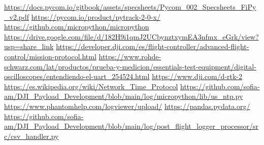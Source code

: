\documentclass[12pt]{article}
\begin{document}
\clearpage
{}
\begin{thebibliography}{9}
   \url{https://docs.pycom.io/gitbook/assets/specsheets/Pycom_002_Specsheets_FiPy_v2.pdf}
   \url{https://pycom.io/product/pytrack-2-0-x/}
   \url{https://github.com/micropython/micropython}
   \url{https://drive.google.com/file/d/182H9i1qmJ2UCbynztxymEA3nfmx_eGrk/view?usp=share_link}
   \url{https://developer.dji.com/es/flight-controller/advanced-flight-control/mission-protocol.html}
   \url{https://www.rohde-schwarz.com/lat/productos/prueba-y-medicion/essentials-test-equipment/digital-oscilloscopes/entendiendo-el-uart_254524.html}
   \url{https://www.dji.com/d-rtk-2}
   \url{https://es.wikipedia.org/wiki/Network_Time_Protocol}
   \url{https://github.com/sofia-am/DJI_Payload_Development/blob/main/log/micropython/lib/us_ntp.py}
   \url{https://www.phantomhelp.com/logviewer/upload/}
   \url{https://pandas.pydata.org/}
   \url{https://github.com/sofia-am/DJI\_Payload\_Development/blob/main/log/post\_flight\_logger\_processor/src/csv\_handler.py}

\end{thebibliography}
\end{document}

